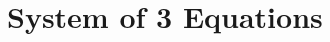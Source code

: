 \documentclass[../../main.tex]{subfiles}
\begin{document}
\chapter{System of 3 Equations}
\end{document}
